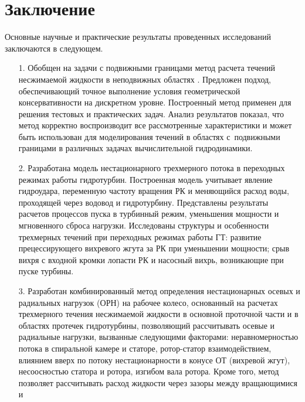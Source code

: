 \chapter*{Заключение}

Основные научные и практические результаты проведенных исследований заключаются в следующем.

\begin{enumerate}
  \item[1.] Обобщен на задачи с подвижными границами метод расчета течений несжимаемой жидкости в 
            неподвижных областях \cite{Cher}. Предложен подход, обеспечивающий точное выполнение 
            условия геометрической консервативности на дискретном уровне. Построенный метод применен 
            для решения тестовых и практических задач. Анализ результатов показал, что метод 
            корректно воспроизводит все рассмотренные характеристики и может быть использован для 
            моделирования течений в областях с~подвижными границами в различных задачах 
            вычислительной гидродинамики. 
  \item[2.] Разработана модель нестационарного трехмерного потока в 
            переходных режимах работы гидротурбин. Построенная модель учитывает явление гидроудара, 
            переменную частоту вращения РК и меняющийся расход воды, проходящей через водовод и гидротурбину. 
            Представлены результаты расчетов процессов пуска в турбинный режим, уменьшения мощности и 
            мгновенного сброса нагрузки. Исследованы структуры и особенности трехмерных течений при переходных
            режимах работы ГТ: развитие прецессирующего вихревого жгута за РК при уменьшении мощности; срыв 
            вихря с входной кромки лопасти РК и насосный вихрь, возникающие при пуске турбины. 
  \item[3.] Разработан комбинированный метод определения нестационарных осевых и радиальных 
            нагрузок (ОРН) на рабочее колесо, основанный на расчетах трехмерного течения 
            несжимаемой жидкости в основной проточной части и в 
            областях протечек гидротурбины, позволяющий рассчитывать осевые и радиальные нагрузки, 
            вызванные следующими факторами: неравномерностью потока в спиральной камере и статоре, 
            ротор-статор взаимодействием, влиянием вверх по потоку нестационарности 
            в конусе ОТ (вихревой жгут), несоосностью статора и ротора, изгибом вала ротора. Кроме 
            того, метод позволяет рассчитывать расход жидкости через зазоры между вращающимися и 

\end{enumerate}
